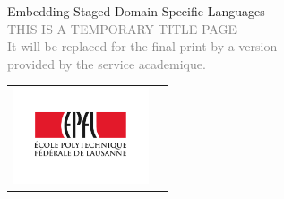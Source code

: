 \begin{titlepage}
\begin{center}
\sffamily


\null\vspace{2cm}
{\huge Embedding Staged Domain-Specific Languages} \\[24pt]
\textcolor{gray}{\small{THIS IS A TEMPORARY TITLE PAGE \\ It will be replaced for the final print by a version \\ provided by the service academique.}}

\vfill

\begin{tabular} {cc}
\parbox{0.3\textwidth}{\includegraphics[width=4cm]{images/epfl}}
&
%
%
\small
%
%
\end{tabular}
\end{center}
\vspace{2cm}
\end{titlepage}
